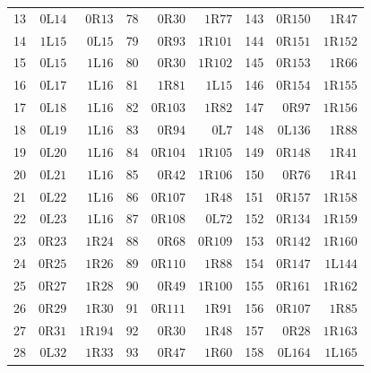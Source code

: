 {\begin{longtable}{@{}rrrrrrrrr@{}}
13 & $0\mathrm{L}14$ & $0\mathrm{R}13$ & 78 & $0\mathrm{R}30$ & $1\mathrm{R}77$ & 143 & $0\mathrm{R}150$ & $1\mathrm{R}47$\\
14 & $1\mathrm{L}15$ & $0\mathrm{L}15$ & 79 & $0\mathrm{R}93$ & $1\mathrm{R}101$ & 144 & $0\mathrm{R}151$ & $1\mathrm{R}152$\\
15 & $0\mathrm{L}15$ & $1\mathrm{L}16$ & 80 & $0\mathrm{R}30$ & $1\mathrm{R}102$ & 145 & $0\mathrm{R}153$ & $1\mathrm{R}66$\\
16 & $0\mathrm{L}17$ & $1\mathrm{L}16$ & 81 & $1\mathrm{R}81$ & $1\mathrm{L}15$ & 146 & $0\mathrm{R}154$ & $1\mathrm{R}155$\\
17 & $0\mathrm{L}18$ & $1\mathrm{L}16$ & 82 & $0\mathrm{R}103$ & $1\mathrm{R}82$ & 147 & $0\mathrm{R}97$ & $1\mathrm{R}156$\\
18 & $0\mathrm{L}19$ & $1\mathrm{L}16$ & 83 & $0\mathrm{R}94$ & $0\mathrm{L}7$ & 148 & $0\mathrm{L}136$ & $1\mathrm{R}88$\\
19 & $0\mathrm{L}20$ & $1\mathrm{L}16$ & 84 & $0\mathrm{R}104$ & $1\mathrm{R}105$ & 149 & $0\mathrm{R}148$ & $1\mathrm{R}41$\\
20 & $0\mathrm{L}21$ & $1\mathrm{L}16$ & 85 & $0\mathrm{R}42$ & $1\mathrm{R}106$ & 150 & $0\mathrm{R}76$ & $1\mathrm{R}41$\\
21 & $0\mathrm{L}22$ & $1\mathrm{L}16$ & 86 & $0\mathrm{R}107$ & $1\mathrm{R}48$ & 151 & $0\mathrm{R}157$ & $1\mathrm{R}158$\\
22 & $0\mathrm{L}23$ & $1\mathrm{L}16$ & 87 & $0\mathrm{R}108$ & $0\mathrm{L}72$ & 152 & $0\mathrm{R}134$ & $1\mathrm{R}159$\\
23 & $0\mathrm{R}23$ & $1\mathrm{R}24$ & 88 & $0\mathrm{R}68$ & $0\mathrm{R}109$ & 153 & $0\mathrm{R}142$ & $1\mathrm{R}160$\\
24 & $0\mathrm{R}25$ & $1\mathrm{R}26$ & 89 & $0\mathrm{R}110$ & $1\mathrm{R}88$ & 154 & $0\mathrm{R}147$ & $1\mathrm{L}144$\\
25 & $0\mathrm{R}27$ & $1\mathrm{R}28$ & 90 & $0\mathrm{R}49$ & $1\mathrm{R}100$ & 155 & $0\mathrm{R}161$ & $1\mathrm{R}162$\\
26 & $0\mathrm{R}29$ & $1\mathrm{R}30$ & 91 & $0\mathrm{R}111$ & $1\mathrm{R}91$ & 156 & $0\mathrm{R}107$ & $1\mathrm{R}85$\\
27 & $0\mathrm{R}31$ & $1\mathrm{R}194$ & 92 & $0\mathrm{R}30$ & $1\mathrm{R}48$ & 157 & $0\mathrm{R}28$ & $1\mathrm{R}163$\\
28 & $0\mathrm{L}32$ & $1\mathrm{R}33$ & 93 & $0\mathrm{R}47$ & $1\mathrm{R}60$ & 158 & $0\mathrm{L}164$ & $1\mathrm{L}165$\\

\end{longtable}}
